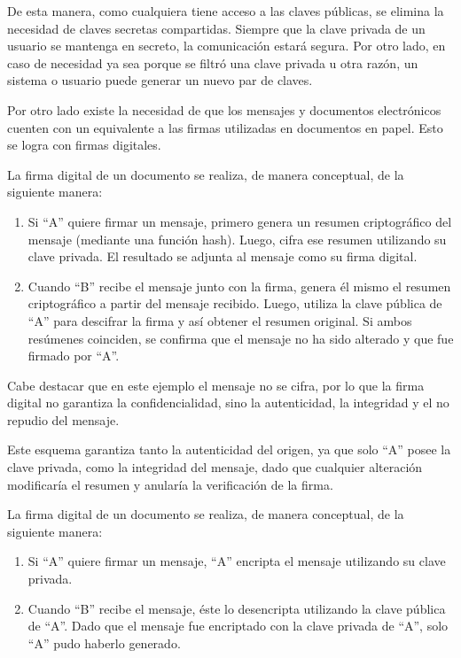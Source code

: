De esta manera, como cualquiera tiene acceso a las claves públicas, se elimina la necesidad de claves secretas compartidas. Siempre que la clave privada de un usuario se mantenga en secreto, la comunicación estará segura. Por otro lado, en caso de necesidad ya sea porque se filtró una clave privada u otra razón, un sistema o usuario puede generar un nuevo par de claves.

Por otro lado existe la necesidad de que los mensajes y documentos electrónicos cuenten con un equivalente a las firmas utilizadas en documentos en papel. Esto se logra con firmas digitales. 

La firma digital de un documento se realiza, de manera conceptual, de la siguiente manera:

\begin{enumerate}
    \item Si ``A'' quiere firmar un mensaje, primero genera un resumen criptográfico del mensaje (mediante una función hash). Luego, cifra ese resumen utilizando su clave privada. El resultado se adjunta al mensaje como su firma digital.

    \item Cuando ``B'' recibe el mensaje junto con la firma, genera él mismo el resumen criptográfico a partir del mensaje recibido. Luego, utiliza la clave pública de ``A'' para descifrar la firma y así obtener el resumen original. Si ambos resúmenes coinciden, se confirma que el mensaje no ha sido alterado y que fue firmado por ``A''.
\end{enumerate}

Cabe destacar que en este ejemplo el mensaje no se cifra, por lo que la firma digital no garantiza la confidencialidad, sino la autenticidad, la integridad y el no repudio del mensaje.

Este esquema garantiza tanto la autenticidad del origen, ya que solo ``A'' posee la clave privada, como la integridad del mensaje, dado que cualquier alteración modificaría el resumen y anularía la verificación de la firma.

La firma digital de un documento se realiza, de manera conceptual, de la siguiente manera:

\begin{enumerate}
    \item Si ``A'' quiere firmar un mensaje, ``A'' encripta el mensaje utilizando su clave privada.

    \item Cuando ``B'' recibe el mensaje, éste lo desencripta utilizando la clave pública de ``A''. Dado que el mensaje fue encriptado con la clave privada de ``A'', solo ``A'' pudo haberlo generado. 
\end{enumerate}

